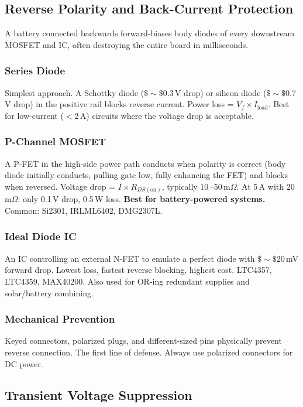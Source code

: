 \documentclass[11pt,letterpaper,twoside,openany]{book}
\begin{document}
\subsection{Reverse Polarity and Back-Current Protection}
\label{sec:reverse}

A battery connected backwards forward-biases body diodes of every downstream MOSFET and IC, often destroying the entire board in milliseconds.

\subsubsection{Series Diode}
Simplest approach. A Schottky diode ($\$\sim\$$0.3\,V drop) or silicon diode ($\$\sim\$$0.7\,V drop) in the positive rail blocks reverse current. Power loss = $V_f \times I_{\text{load}}$. Best for low-current ($<$2\,A) circuits where the voltage drop is acceptable.

\subsubsection{P-Channel MOSFET}
A P-FET in the high-side power path conducts when polarity is correct (body diode initially conducts, pulling gate low, fully enhancing the FET) and blocks when reversed. Voltage drop = $I \times R_{DS(\text{on})}$, typically 10\,--50\,m$\Omega$. At 5\,A with 20\,m$\Omega$: only 0.1\,V drop, 0.5\,W loss. \textbf{Best for battery-powered systems.} Common: Si2301, IRLML6402, DMG2307L.

\subsubsection{Ideal Diode IC}
An IC controlling an external N-FET to emulate a perfect diode with $\$\sim\$$20\,mV forward drop. Lowest loss, fastest reverse blocking, highest cost. LTC4357, LTC4359, MAX40200. Also used for OR-ing redundant supplies and solar/battery combining.

\subsubsection{Mechanical Prevention}
Keyed connectors, polarized plugs, and different-sized pins physically prevent reverse connection. The first line of defense. Always use polarized connectors for DC power.


\subsection{Transient Voltage Suppression}
\label{sec:transient}
\end{document}
